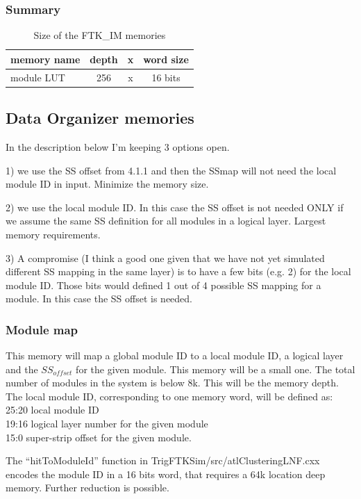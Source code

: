 \documentclass[10pt]{article}
\numberwithin{figure}{section}
\numberwithin{equation}{section}
\numberwithin{table}{section}
\newcommand{\0}{\phantom{0}}
\begin{document}
\subsubsection{Summary}
\begin{table}[h]
\begin{tabular}{l|ccc}
memory name & depth & x & word size \\ \hline
module LUT & 256 & x & 16 bits \\
\end{tabular}
\caption{\label{tab:FTK_IMmems}Size of the FTK\_IM memories}
\end{table}


\subsection{Data Organizer memories}
In the description below I'm keeping 3 options open.

1) we use the SS offset from 4.1.1 and then the SSmap will not need the local module ID in input.
     Minimize the memory size.

2) we use the local module ID. In this case the SS offset is not needed ONLY if we assume the same SS definition for all modules in a logical layer.
    Largest memory requirements.

3) A compromise (I think a good one given that we have not yet simulated different SS mapping in the same layer)
     is to have a few bits (e.g. 2) for the local module ID.
     Those bits would defined 1 out of 4 possible SS mapping for a module.
     In this case the SS offset is needed.

\subsubsection{Module map}
This memory will map a global module ID to a local module ID, a logical layer and the $SS_{offset}$ for the given module.
This memory will be a small one. The total number of modules in the system is below 8k. This will be the memory depth. \\
The local module ID, corresponding to one memory word, will be defined as: \\
25:20 local module ID \\
19:16 logical layer number for the given module \\
15:0 super-strip offset for the given module.

The ``hitToModuleId'' function in TrigFTKSim/src/atlClusteringLNF.cxx encodes the module ID in a 16 bits word, that requires a 64k location deep memory. Further reduction is possible.
\end{document}
